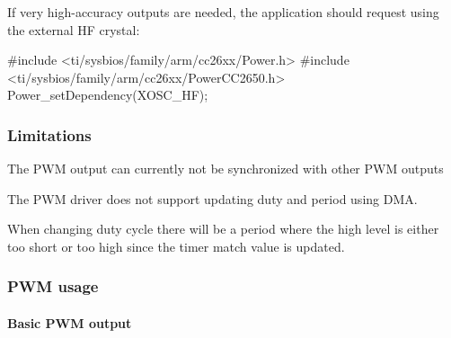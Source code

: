 If very high-\/accuracy outputs are needed, the application should request using the external H\+F crystal\+: 
\begin{DoxyCode}
\textcolor{preprocessor}{#include <ti/sysbios/family/arm/cc26xx/Power.h>}
\textcolor{preprocessor}{#include <ti/sysbios/family/arm/cc26xx/PowerCC2650.h>}
Power_setDependency(XOSC\_HF);
\end{DoxyCode}


\subsubsection*{Limitations}


\begin{DoxyItemize}
\item The P\+W\+M output can currently not be synchronized with other P\+W\+M outputs
\item The P\+W\+M driver does not support updating duty and period using D\+M\+A.
\item When changing duty cycle there will be a period where the high level is either too short or too high since the timer match value is updated. \subsubsection*{P\+W\+M usage}
\end{DoxyItemize}

\paragraph*{Basic P\+W\+M output}

